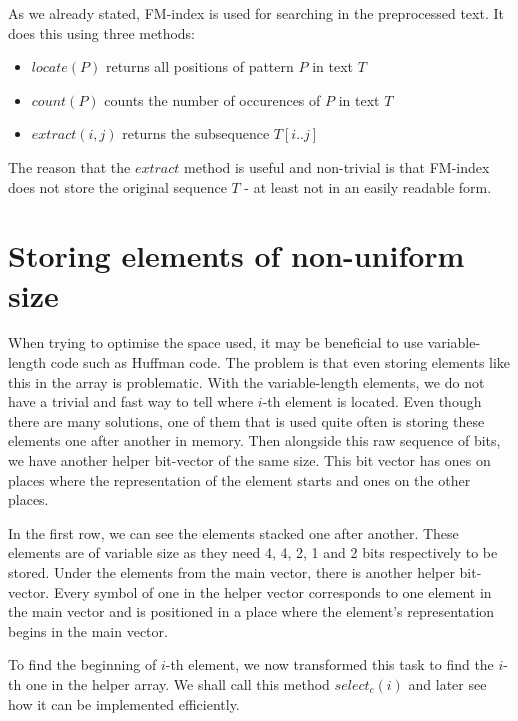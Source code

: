As we already stated, FM-index is used for searching in the preprocessed text.
It does this using three methods:

\begin{itemize}
\item $locate(P)$ returns all positions of pattern $P$ in text $T$
\item $count(P)$ counts the number of occurences of $P$ in text $T$
\item $extract(i, j)$ returns the subsequence $T[i..j]$
\end{itemize}

The reason that the $extract$ method is useful and non-trivial is that FM-index
does not store the original sequence $T$ - at least not in an easily readable form.


\section{Storing elements of non-uniform size}

When trying to optimise the space used, it may be beneficial to use variable-length
code such as Huffman code. The problem is that even storing elements like this in
the array is problematic. With the variable-length elements, we do not have a trivial
and fast way to tell where $i$-th element is located. Even though there are many
solutions, one of them that is used quite often is storing these elements one after
another in memory. Then alongside this raw sequence of bits, we have another helper
bit-vector of the same size. This bit vector has ones on places where the representation
of the element starts and ones on the other places.

In the first row, we can see the elements stacked one after another. These elements
are of variable size as they need 4, 4, 2, 1 and 2 bits respectively to be stored.
Under the elements from the main vector, there is another helper bit-vector. Every
symbol of one in the helper vector corresponds to one element in the main vector
and is positioned in a place where the element's representation begins in the main vector.

To find the beginning of $i$-th element, we now transformed this task to find the
$i$-th one in the helper array. We shall call this method $select_c(i)$ and later
see how it can be implemented efficiently.

